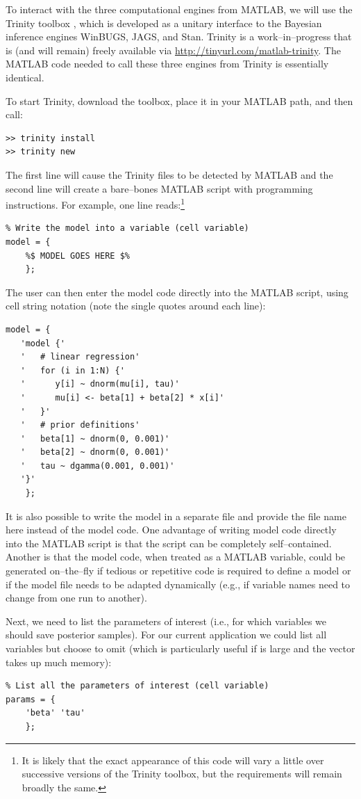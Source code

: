 To interact with the three computational engines from MATLAB, we will use the Trinity toolbox \cite{vandekerckhovetrinity}, which is developed as a unitary interface to the Bayesian inference engines WinBUGS, JAGS, and Stan. Trinity is a work--in--progress that is (and will remain) freely available via \url{http://tinyurl.com/matlab-trinity}. The MATLAB code needed to call these three engines from Trinity is essentially identical.

To start Trinity, download the toolbox, place it in your MATLAB path, and then call:

\begin{lstlisting}
>> trinity install
>> trinity new
\end{lstlisting}
\noindent The first line will cause the Trinity files to be detected by MATLAB and the second line will create a bare--bones MATLAB script with programming instructions. For example, one line reads:\footnote{It is likely that the exact appearance of this code will vary a little over successive versions of the Trinity toolbox, but the requirements will remain broadly the same.}

\begin{lstlisting}
% Write the model into a variable (cell variable)
model = {
    %$ MODEL GOES HERE $%
    };
\end{lstlisting}
\noindent The user can then enter the model code directly into the MATLAB script, using cell string notation (note the single quotes around each line):

\begin{lstlisting}
model = {
   'model {'
   '   # linear regression'
   '   for (i in 1:N) {'
   '      y[i] ~ dnorm(mu[i], tau)'
   '      mu[i] <- beta[1] + beta[2] * x[i]'
   '   }'
   '   # prior definitions'
   '   beta[1] ~ dnorm(0, 0.001)'
   '   beta[2] ~ dnorm(0, 0.001)'
   '   tau ~ dgamma(0.001, 0.001)'
   '}'
    };
\end{lstlisting}
\noindent It is also possible to write the model in a separate file and provide the file name here instead of the model code. One advantage of writing model code directly into the MATLAB script is that the script can be completely self--contained. Another is that the model code, when treated as a MATLAB variable, could be generated on--the--fly if tedious or repetitive code is required to define a model or if the model file needs to be adapted dynamically (e.g., if variable names need to change from one run to another).

Next, we need to list the parameters of interest (i.e., for which variables we should save posterior samples). For our current application we could list all variables but choose to omit  (which is particularly useful if  is large and the vector  takes up much memory):
\begin{lstlisting}
% List all the parameters of interest (cell variable)
params = {
    'beta' 'tau'
    };
\end{lstlisting}


